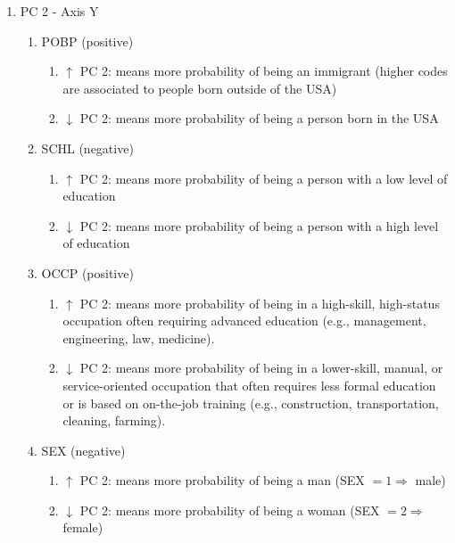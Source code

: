 \begin{enumerate}
    \item PC 2 - Axis Y
    \begin{enumerate}
        \item POBP (positive)
        \begin{enumerate}
            \item $\uparrow$ PC 2: means more probability of being an immigrant (higher codes are associated to people born outside of the USA)
            \item $\downarrow$ PC 2: means more probability of being a person born in the USA
        \end{enumerate}

        \item SCHL (negative)
        \begin{enumerate}
            \item $\uparrow$ PC 2: means more probability of being a person with a low level of education
            \item $\downarrow$ PC 2: means more probability of being a person with a high level of education
        \end{enumerate}

        \item OCCP (positive)
        \begin{enumerate}
            \item $\uparrow$ PC 2: means more probability of being in a high-skill, high-status occupation often requiring advanced education (e.g., management, engineering, law, medicine).
            \item $\downarrow$ PC 2: means more probability of being in a  lower-skill, manual, or service-oriented occupation that often requires less formal education or is based on on-the-job training (e.g., construction, transportation, cleaning, farming). 
        \end{enumerate}

        \item SEX (negative)
        \begin{enumerate}
            \item $\uparrow$ PC 2: means more probability of being a man (SEX $= 1 \Rightarrow $ male)
            \item $\downarrow$ PC 2: means more probability of being a woman (SEX $= 2 \Rightarrow $ female)
        \end{enumerate}
    \end{enumerate}
\end{enumerate}

